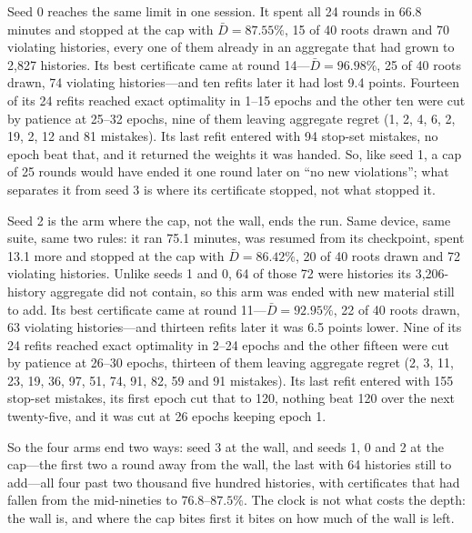 \documentclass[conference]{IEEEtran}
\begin{document}
Seed 0 reaches the same limit in one session. It spent all 24 rounds in 66.8 minutes and stopped at the cap with $\bar D=87.55\%$, 15 of 40 roots drawn and 70 violating histories, every one of them already in an aggregate that had grown to 2{,}827 histories. Its best certificate came at round 14---$\bar D=96.98\%$, 25 of 40 roots drawn, 74 violating histories---and ten refits later it had lost 9.4 points. Fourteen of its 24 refits reached exact optimality in 1--15 epochs and the other ten were cut by patience at 25--32 epochs, nine of them leaving aggregate regret (1, 2, 4, 6, 2, 19, 2, 12 and 81 mistakes). Its last refit entered with 94 stop-set mistakes, no epoch beat that, and it returned the weights it was handed. So, like seed 1, a cap of 25 rounds would have ended it one round later on ``no new violations''; what separates it from seed 3 is where its certificate stopped, not what stopped it.

Seed 2 is the arm where the cap, not the wall, ends the run. Same device, same suite, same two rules: it ran 75.1 minutes, was resumed from its checkpoint, spent 13.1 more and stopped at the cap with $\bar D=86.42\%$, 20 of 40 roots drawn and 72 violating histories. Unlike seeds 1 and 0, 64 of those 72 were histories its 3{,}206-history aggregate did not contain, so this arm was ended with new material still to add. Its best certificate came at round 11---$\bar D=92.95\%$, 22 of 40 roots drawn, 63 violating histories---and thirteen refits later it was 6.5 points lower. Nine of its 24 refits reached exact optimality in 2--24 epochs and the other fifteen were cut by patience at 26--30 epochs, thirteen of them leaving aggregate regret (2, 3, 11, 23, 19, 36, 97, 51, 74, 91, 82, 59 and 91 mistakes). Its last refit entered with 155 stop-set mistakes, its first epoch cut that to 120, nothing beat 120 over the next twenty-five, and it was cut at 26 epochs keeping epoch 1.

So the four arms end two ways: seed 3 at the wall, and seeds 1, 0 and 2 at the cap---the first two a round away from the wall, the last with 64 histories still to add---all four past two thousand five hundred histories, with certificates that had fallen from the mid-nineties to $76.8$--$87.5\%$. The clock is not what costs the depth: the wall is, and where the cap bites first it bites on how much of the wall is left.
\end{document}

